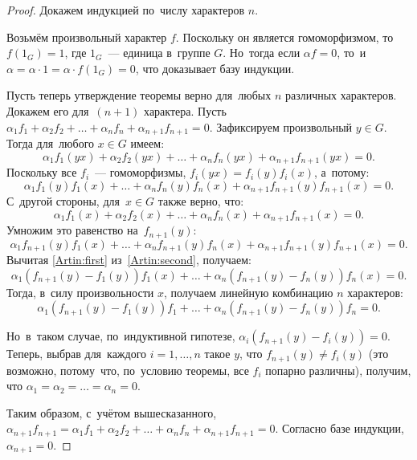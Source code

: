 \documentclass[a4paper,oneside]{article}
\begin{document}
\begin{proof}

Докажем индукцией по~числу характеров $n$.

Возьмём произвольный характер $f$. Поскольку он является гомоморфизмом,
то~$f(1_G) = 1$, где $1_G$~— единица в~группе $G$. Но~тогда если $\alpha f = 0$,
то~и~$\alpha = \alpha \cdot 1 = \alpha \cdot f(1_G) = 0$, что доказывает базу индукции.

Пусть теперь утверждение теоремы верно для~любых $n$ различных характеров. Докажем его для~$(n + 1)$ характера.
Пусть $\alpha_1 f_1 + \alpha_2 f_2 + \ldots + \alpha_n f_n + \alpha_{n + 1} f_{n + 1} = 0$.
Зафиксируем произвольный $y \in G$. Тогда для~любого $x \in G$ имеем:
\begin{equation}\label{Artin:first}
    \alpha_1 f_1(yx) + \alpha_2 f_2(yx) + \ldots + \alpha_n f_n(yx) + \alpha_{n + 1} f_{n + 1}(yx) = 0.
\end{equation}
Поскольку все $f_i$~— гомоморфизмы, $f_i(yx) = f_i(y) f_i(x)$, а~потому:
$$
    \alpha_1 f_1(y) f_1(x) + \ldots + \alpha_n f_n(y) f_n(x) + \alpha_{n + 1} f_{n + 1}(y) f_{n + 1}(x) = 0.
$$
С~другой стороны, для~$x \in G$ также верно, что:
$$
    \alpha_1 f_1(x) + \alpha_2 f_2(x) + \ldots + \alpha_n f_n(x) + \alpha_{n + 1} f_{n + 1}(x) = 0.
$$
Умножим это равенство на~$f_{n + 1}(y)$:
\begin{equation}\label{Artin:second}
    \alpha_1 f_{n + 1}(y) f_1(x) + \ldots + \alpha_n f_{n + 1}(y) f_n(x) + \alpha_{n + 1} f_{n + 1}(y) f_{n + 1}(x) = 0.
\end{equation}
Вычитая \eqref{Artin:first} из~\eqref{Artin:second}, получаем:
$$
    \alpha_1 (f_{n + 1}(y) - f_1(y)) f_1(x) + \ldots + \alpha_n (f_{n + 1}(y) - f_n(y)) f_n(x) = 0.
$$
Тогда, в~силу произвольности $x$, получаем линейную комбинацию $n$ характеров:
$$
    \alpha_1 (f_{n + 1}(y) - f_1(y)) f_1 + \ldots + \alpha_n (f_{n + 1}(y) - f_n(y)) f_n = 0.
$$

Но~в~таком случае, по~индуктивной гипотезе, $\alpha_i (f_{n + 1}(y) - f_i(y)) = 0$.
Теперь, выбрав для~каждого $i = 1, \ldots, n$ такое $y$, что $f_{n + 1}(y) \neq f_i(y)$
(это возможно, потому~что, по~условию теоремы, все $f_i$ попарно различны), получим,
что $\alpha_1 = \alpha_2 = \ldots = \alpha_n = 0$.

Таким образом, с~учётом вышесказанного, $\alpha_{n + 1} f_{n + 1} = \alpha_1 f_1 + \alpha_2 f_2 + \ldots + \alpha_n f_n + \alpha_{n + 1} f_{n + 1} = 0$.
Согласно базе индукции, $\alpha_{n + 1} = 0$.
\end{proof}
\end{document}

